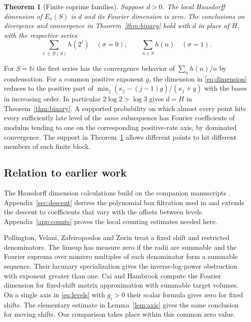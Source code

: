 \documentclass[11pt,a4paper,reqno]{amsart}
\newtheorem{theorem}{Theorem}[section]
\theoremstyle{definition}
\theoremstyle{remark}
\numberwithin{equation}{section}
\begin{document}
\begin{theorem}[Finite coprime families]\label{thm:main}
Suppose \(d>0\). The local Hausdorff dimension of \(E_\sigma(S)\) is
\(d\) and its Fourier dimension is zero. The conclusions on
divergence and convergence in Theorem~\ref{thm:binary} hold with \(d\)
in place of \(H\), with the respective series
\begin{equation}\label{eq:series}
 \sum_{\ell\in\mathcal B(S)} h(2^\ell)
 \quad(\sigma=0),\qquad
 \sum_{n\in S}h(n)\quad(\sigma=1).
\end{equation}
\end{theorem}
For \(S=\mathbb N\) the first series has the convergence behavior of
\(\sum_n h(n)/n\) by condensation. For a common positive exponent \(g\),
the dimension in \eqref{eq:dimension} reduces to the positive part of
\(\min_j(\kappa_j-(j-1)g)/(\kappa_j+g)\) with the bases in increasing
order. In particular \(2\log 2>\log3\) gives \(d=H\) in
Theorem~\ref{thm:binary}. A supported probability on which almost
every point hits every sufficiently late level of the \emph{same}
subsequence has Fourier coefficients of modulus tending to one on
the corresponding positive-rate axis, by dominated convergence.
The support in Theorem~\ref{thm:main} allows different points to hit
different members of each finite block.

\subsection{Relation to earlier work}
The Hausdorff dimension calculations build on the companion
manuscripts \cite{Diagonal,Quotients}. Appendix~\ref{sec:descent}
derives the polynomial box filtration used in \cite{Quotients} and
extends the descent to coefficients that vary with the offsets between
levels. Appendix~\ref{app:counts} proves the local counting estimates
needed here.

Pollington, Velani, Zafeiropoulos and Zorin
\cite[Theorem~2, (26) and (28)]{PVZZ} treat a fixed shift and
restricted denominators. The limsup has measure zero if the radii
are summable and the Fourier suprema over nonzero multiples of each
denominator form a summable sequence. Their lacunary specialization gives
the inverse-log-power obstruction with exponent greater than one.
Cai and Hambrook \cite[Theorem~1.4.1]{CH} compute the Fourier
dimension for fixed-shift matrix approximation with summable target
volumes. On a single axis in \eqref{eq:levels} with \(g_i>0\) their
scalar formula gives zero for fixed shifts. The elementary estimate
in Lemma~\ref{lem:axis} gives the same conclusion for moving shifts.
Our comparison takes place within this common zero value.
\end{document}
